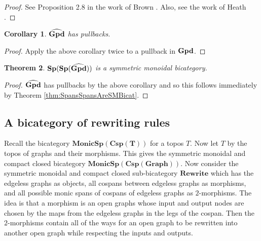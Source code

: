 \documentclass[11pt]{amsart}
\newcommand{\cat}[1]{\mathbf{#1}}
\newcommand{\bimonspcsp}[1]{\mathbf{MonicSp(Csp(#1))}}
\newtheorem{thm}{Theorem}[section]
\newtheorem{cor}[thm]{Corollary}
\theoremstyle{remark}
\theoremstyle{definition}
\begin{document}
\begin{proof}
	See Proposition 2.8 in the work of Brown \cite{Brown}. Also, see the work of Heath \cite{Heath}.
\end{proof}
\begin{cor}
	$\bold{\widehat{Gpd}}$ has pullbacks.
\end{cor}
\begin{proof}
	Apply the above corollary twice to a pullback in $\bold{Gpd}$.
\end{proof}
\begin{thm}
	$\bold{Sp(Sp(\widehat{Gpd}))}$ is a symmetric monoidal bicategory.
\end{thm}
\begin{proof}
	$\bold{\widehat{Gpd}}$ has pullbacks by the above corollary and so this follows immediately by Theorem \ref{thm:SpansSpansAreSMBicat}.
\end{proof}

\subsection{A bicategory of rewriting rules} %
\label{subsec:Rewrite}

Recall the bicategory $\bimonspcsp{T}$ for a topos $T$.  Now let $T$ by the topos of graphs and their morphisms.  This gives the symmetric monoidal and compact closed bicategory $\bimonspcsp{Graph}$.  Now consider the symmetric monoidal and compact closed sub-bicategory $\cat{Rewrite}$ which has the edgeless graphs as objects, all cospans between edgeless graphs as morphisms, and all possible monic spans of cospans of edgeless graphs as $2$-morphisms.  The idea is that a morphism is an open graphs whose input and output nodes are chosen by the maps from the edgeless graphs in the legs of the cospan. Then the $2$-morphisms contain all of the ways for an open graph to be rewritten into another open graph while respecting the inputs and outputs. 
\end{document}

